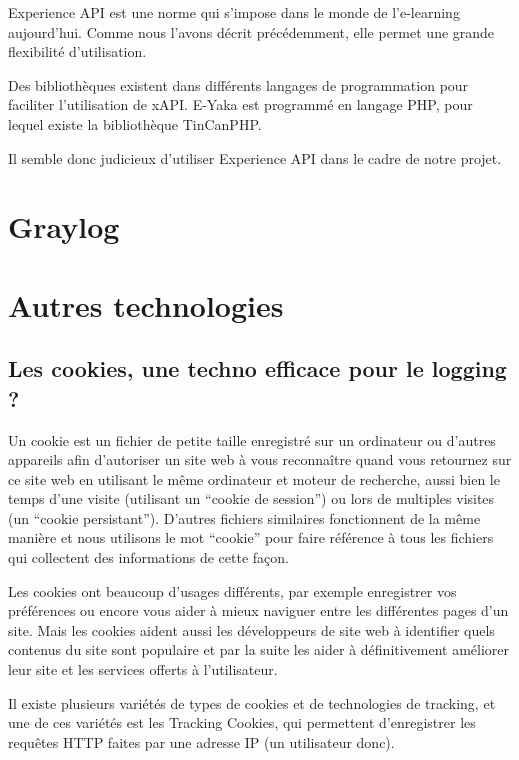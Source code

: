             Experience API est une norme qui s’impose dans le monde de l’e-learning aujourd’hui. Comme nous l’avons décrit précédemment, elle permet une grande flexibilité d’utilisation.

            Des bibliothèques existent dans différents langages de programmation pour faciliter l’utilisation de xAPI. E-Yaka est programmé en langage PHP, pour lequel existe la bibliothèque TinCanPHP.

            Il semble donc judicieux d’utiliser Experience API dans le cadre de notre projet.


    \section{Graylog  }
    
    \section{Autres technologies}
    
        \subsection{Les cookies, une techno efficace pour le logging ?}
        
            Un cookie est un fichier de petite taille enregistré sur un ordinateur ou d'autres appareils afin d'autoriser un site web à vous reconnaître quand vous retournez sur ce site web en utilisant le même ordinateur et moteur de recherche, aussi bien le temps d'une visite (utilisant un \enquote{cookie de session}) ou lors de multiples visites (un \enquote{cookie persistant}). D'autres fichiers similaires fonctionnent de la même manière et nous utilisons le mot \enquote{cookie} pour faire référence à tous les fichiers qui collectent des informations de cette façon.
            
            Les cookies ont beaucoup d'usages différents, par exemple enregistrer vos préférences ou encore vous aider à mieux naviguer entre les différentes pages d'un site. Mais les cookies aident aussi les développeurs de site web à identifier quels contenus du site sont populaire et par la suite les aider à définitivement améliorer leur site et les services offerts à l'utilisateur.
            
            Il existe plusieurs variétés de types de cookies et de technologies de tracking, et une de ces variétés est les Tracking Cookies, qui permettent d'enregistrer les requêtes HTTP faites par une adresse IP (un utilisateur donc). 
            
